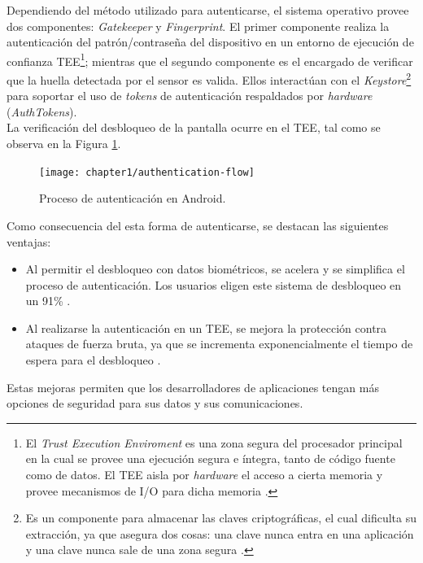 Dependiendo del método utilizado para autenticarse, el sistema operativo provee dos componentes: \textit{Gatekeeper} y \textit{Fingerprint}. El primer componente realiza la autenticación del patrón/contraseña del dispositivo en un entorno de ejecución de confianza TEE\footnote{El \textit{Trust Execution Enviroment} es una zona segura del procesador principal en la cual se provee una ejecución segura e íntegra, tanto de código fuente como de datos. El TEE aisla por \textit{hardware} el acceso a cierta memoria y provee mecanismos de I/O para dicha memoria \cite{tee2011}.}; mientras que el segundo componente es el encargado de verificar que la huella detectada por el sensor es valida. Ellos interactúan con el \textit{Keystore}\footnote{Es un componente para almacenar las claves criptográficas, el cual dificulta su extracción, ya que asegura dos cosas: una clave nunca entra en una aplicación y una clave nunca sale de una zona segura \cite{dakss}.} para soportar el uso de \textit{tokens} de autenticación respaldados por \textit{hardware} (\textit{AuthTokens}).\\

La verificación del desbloqueo de la pantalla ocurre en el TEE, tal como se observa en la Figura \ref{fig:ch01:authentication-flow}.\\

\begin{figure}[htbp]
	\begin{center}
		\texttt{[image: chapter1/authentication-flow]}
		\caption{Proceso de autenticación en Android\cite{aossec}.}
		\label{fig:ch01:authentication-flow}
	\end{center}
\end{figure}
Como consecuencia del esta forma de autenticarse, se destacan las siguientes ventajas:
\begin{itemize}
    \item Al permitir el desbloqueo con datos biométricos, se acelera y se simplifica el proceso de autenticación. Los usuarios eligen este sistema de desbloqueo en un 91\% \cite{asreview2015}.
    \item Al realizarse la autenticación en un TEE, se mejora la protección contra ataques de fuerza bruta, ya que se incrementa exponencialmente el tiempo de espera para el desbloqueo \cite{asreview2015}.
\end{itemize}
Estas mejoras permiten que los desarrolladores de aplicaciones tengan más opciones de seguridad para sus datos y sus comunicaciones.

